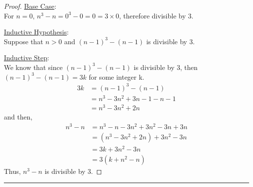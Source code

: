 \documentclass{article}
\def \proofDistance {5pt}
\newcommand{\proofseparator}{\par\noindent\rule{\textwidth}{0.4pt}}
\newcommand{\pf}[1]{
    \vspace{\proofDistance}
    \begin{proof}
    #1
    \end{proof}
    \proofseparator
}
\begin{document}
        \pf{
        \item \underline{Base Case}: \\ 
            For $n = 0$, $n^3-n = 0^3 - 0 = 0 = 3 \times 0$, therefore divisible by 3.\\
        \item \underline{Inductive Hypothesis}: \\
            Suppose that $n > 0$ and $(n-1)^3 - (n-1)$ is divisible by 3. \\
        \item \underline{Inductive Step}: \\
            We know that since $(n-1)^3 - (n-1)$ is divisible by 3, then $(n-1)^3 - (n-1) = 3k$ for some integer k. \\
            \begin{align*}
                3k &= (n-1)^3 - (n-1)\\
                &= n^3 - 3n^2 + 3n - 1 - n - 1\\
                &= n^3 - 3n^2 + 2n
            \end{align*}
            and then,
            \begin{align*}
                n^3 - n &= n^3 - n - 3n^2 + 3n^2 - 3n + 3n\\
                &= (n^3 - 3n^2 + 2n) + 3n^2 - 3n\\
                &= 3k + 3n^2 - 3n\\
                &= 3(k + n^2 - n)
            \end{align*}
            Thus, $n^3 - n$ is divisible by 3.
        }
\end{document}
